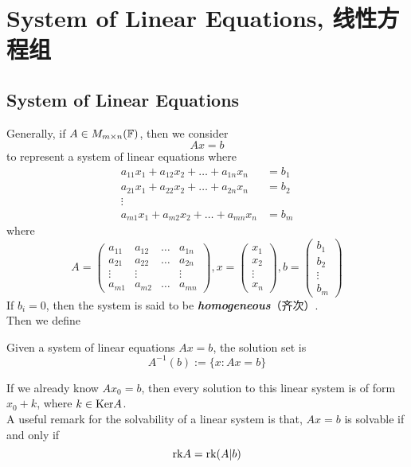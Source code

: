 \section{System of Linear Equations, 线性方程组}
\subsection{System of Linear Equations}
Generally, if $A \in M_{m \times n}(\mathbb{F})$, then we consider
$$Ax = b$$
to represent a system of linear equations where
\begin{align*}
    a_{11}x_1 + a_{12}x_2 + \dots + a_{1n}x_n &= b_1 \\
    a_{21}x_1 + a_{22}x_2 + \dots + a_{2n}x_n &= b_2 \\
    \vdots \\
    a_{m1}x_1 + a_{m2}x_2 + \dots + a_{mn}x_n &= b_m
\end{align*}
where
$$A = \begin{pmatrix}
    a_{11} & a_{12} & \dots & a_{1n} \\
    a_{21} & a_{22} & \dots & a_{2n} \\
    \vdots & \vdots &       & \vdots \\
    a_{m1} & a_{m2} & \dots & a_{mn}
\end{pmatrix},
x = \begin{pmatrix}
    x_1 \\
    x_2 \\
    \vdots \\
    x_n
\end{pmatrix},
b = \begin{pmatrix}
    b_1 \\
    b_2 \\
    \vdots \\
    b_m
\end{pmatrix}$$
If $b_i = 0$, then the system is said to be \textbf{\textit{homogeneous}}（齐次）. \\
Then we define
\begin{definition}
    Given a system of linear equations $Ax = b$, the solution set is
    $$A^{-1}(b) := \{x: Ax = b\}$$
\end{definition}
If we already know $Ax_0 = b$, then every solution to this linear system is of form $x_0 + k$, where $k \in \text{Ker} A$. \\
A useful remark for the solvability of a linear system is that, $Ax=b$ is solvable if and only if
$$\text{rk} A = \text{rk} (A|b)$$

